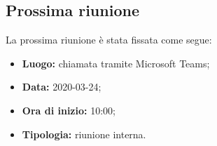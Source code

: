	\subsection{Prossima riunione}
		La prossima riunione è stata fissata come segue: 
		\begin{itemize}
			\item \textbf{Luogo: } chiamata tramite Microsoft Teams; 
			\item \textbf{Data: } 2020-03-24; 
			\item \textbf{Ora di inizio: } 10:00;
			\item \textbf{Tipologia: } riunione interna.
		\end{itemize}